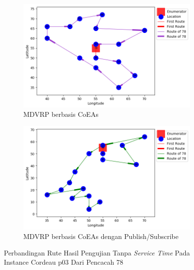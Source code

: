 \begin{figure}[H]
	\centering
	\begin{subfigure}[t]{\textwidth}
		\centering
		\includegraphics[width=\textwidth]{Resources/Images/cordeau_p03/cordeau_p03_notw_78_coes}
		\caption{MDVRP berbasis CoEAs}
		\label{fig:cordeau_p03_notw_78_coes}
	\end{subfigure}
	\begin{subfigure}[t]{\textwidth}
		\centering
		\includegraphics[width=\textwidth]{Resources/Images/cordeau_p03/cordeau_p03_notw_78_pubsub_coes}
		\caption{MDVRP berbasis CoEAs dengan Publish/Subscribe}
		\label{fig:cordeau_p03_notw_78_pubsub_coes}
	\end{subfigure}
	\caption{Perbandingan Rute Hasil Pengujian Tanpa \textit{Service Time} Pada Instance Cordeau p03 Dari Pencacah 78}
	\label{fig:cordeau_p03_notw_78}
\end{figure}


